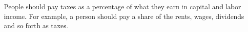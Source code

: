 People should pay taxes as a percentage of what they earn in capital and labor income. For example, a person should pay a share of the rents, wages, dividends and so forth as taxes.
